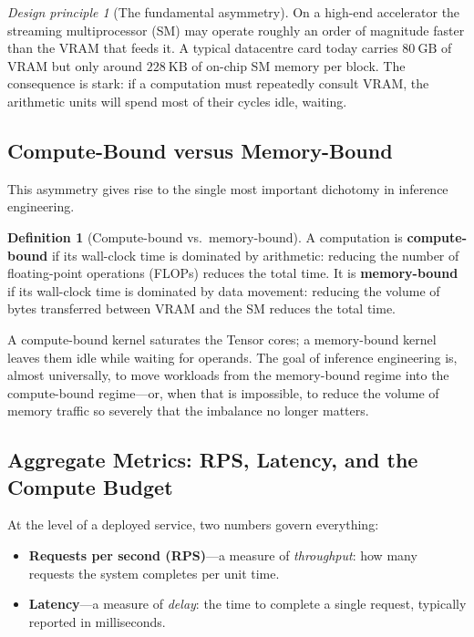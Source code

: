 \documentclass[11pt,a4paper]{article}
\theoremstyle{definition}
\newtheorem{definition}{Definition}[section]
\theoremstyle{remark}
\newtheorem*{principle}{Design principle}
\theoremstyle{plain}
\begin{document}
\begin{principle}[The fundamental asymmetry]
On a high-end accelerator the streaming multiprocessor (SM) may operate
roughly an order of magnitude faster than the VRAM that feeds it. A
typical datacentre card today carries $80~\text{GB}$ of VRAM but only
around $228~\text{KB}$ of on-chip SM memory per block. The consequence is
stark: if a computation must repeatedly consult VRAM, the arithmetic units
will spend most of their cycles idle, waiting.
\end{principle}

\subsection{Compute-Bound versus Memory-Bound}

This asymmetry gives rise to the single most important dichotomy in
inference engineering.

\begin{definition}[Compute-bound vs.\ memory-bound]
A computation is \textbf{compute-bound} if its wall-clock time is
dominated by arithmetic: reducing the number of floating-point operations
(FLOPs) reduces the total time. It is \textbf{memory-bound} if its
wall-clock time is dominated by data movement: reducing the volume of
bytes transferred between VRAM and the SM reduces the total time.
\end{definition}

A compute-bound kernel saturates the Tensor cores; a memory-bound kernel
leaves them idle while waiting for operands. The goal of inference
engineering is, almost universally, to move workloads from the
memory-bound regime into the compute-bound regime---or, when that is
impossible, to reduce the volume of memory traffic so severely that the
imbalance no longer matters.

\subsection{Aggregate Metrics: RPS, Latency, and the Compute Budget}

At the level of a deployed service, two numbers govern everything:

\begin{itemize}[leftmargin=1.5em, itemsep=2pt]
  \item \textbf{Requests per second (RPS)}---a measure of
        \emph{throughput}: how many requests the system completes per
        unit time.
  \item \textbf{Latency}---a measure of \emph{delay}: the time to complete
        a single request, typically reported in milliseconds.
\end{itemize}
\end{document}
